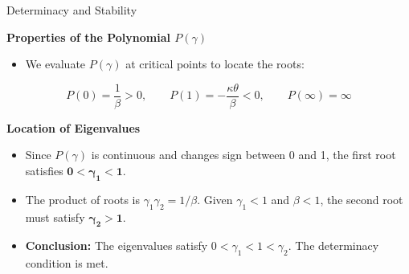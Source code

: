 \documentclass[11pt,aspectratio=169]{beamer}
\begin{document}
\begin{frame}{Determinacy and Stability}
\small

\textbf{Properties of the Polynomial $P(\gamma)$}
\begin{itemize}
  \item We evaluate $P(\gamma)$ at critical points to locate the roots:
\end{itemize}

\begin{equation*}
P(0) = \frac{1}{\beta} > 0, \qquad P(1) = -\frac{\kappa\theta}{\beta} < 0, \qquad P(\infty) = \infty
\end{equation*}



\textbf{Location of Eigenvalues}
\begin{itemize}
  \item Since $P(\gamma)$ is continuous and changes sign between 0 and 1, the first root satisfies $\bm{0 < \gamma_1 < 1}$.
  \item The product of roots is $\gamma_1 \gamma_2 = 1/\beta$. Given $\gamma_1 < 1$ and $\beta < 1$, the second root must satisfy $\bm{\gamma_2 > 1}$.
  \item \textbf{Conclusion:} The eigenvalues satisfy $0 < \gamma_{1} < 1 < \gamma_{2}$. The determinacy condition is met.
\end{itemize}

\end{frame}
\end{document}
